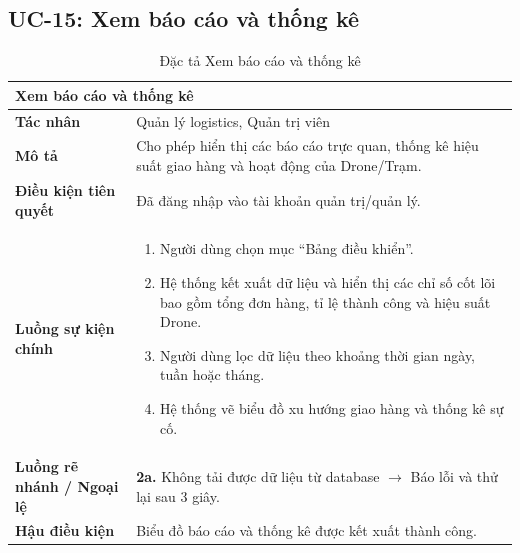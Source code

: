 \subsection{UC-15: Xem báo cáo và thống kê}
\begin{table}[H]
  \centering
  \begin{tabularx}{\textwidth}{|l|X|}
    \hline
    \multicolumn{2}{|l|}{\textbf{Xem báo cáo và thống kê}} \\
    \hline
    \textbf{Tác nhân}           & Quản lý logistics, Quản trị viên \\ \hline
    \textbf{Mô tả}              & Cho phép hiển thị các báo cáo trực quan, thống kê hiệu suất giao hàng và hoạt động của Drone/Trạm. \\ \hline
    \textbf{Điều kiện tiên quyết} & Đã đăng nhập vào tài khoản quản trị/quản lý. \\ \hline
    \textbf{Luồng sự kiện chính} &
      \begin{enumerate}[leftmargin=*, nosep, topsep=0pt]
        \item Người dùng chọn mục ``Bảng điều khiển''.
        \item Hệ thống kết xuất dữ liệu và hiển thị các chỉ số cốt lõi bao gồm tổng đơn hàng, tỉ lệ thành công và hiệu suất Drone.
        \item Người dùng lọc dữ liệu theo khoảng thời gian ngày, tuần hoặc tháng.
        \item Hệ thống vẽ biểu đồ xu hướng giao hàng và thống kê sự cố.
      \end{enumerate} \\ \hline
    \textbf{Luồng rẽ nhánh / Ngoại lệ} &
      \textbf{2a.} Không tải được dữ liệu từ database $\rightarrow$ Báo lỗi và thử lại sau 3 giây. \\ \hline
    \textbf{Hậu điều kiện}      & Biểu đồ báo cáo và thống kê được kết xuất thành công. \\
    \hline
  \end{tabularx}
  \caption{Đặc tả Xem báo cáo và thống kê}
  \label{tab:uc15}
\end{table}

